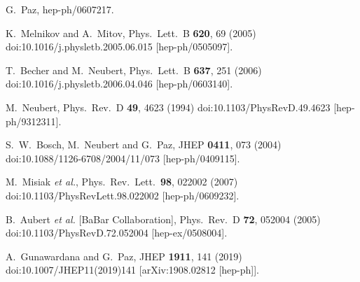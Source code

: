 \begin{thebibliography}{99}
  G.~Paz,
  hep-ph/0607217.
  
  K.~Melnikov and A.~Mitov,
  Phys.\ Lett.\ B {\bf 620}, 69 (2005)
  doi:10.1016/j.physletb.2005.06.015
  [hep-ph/0505097].
  
  T.~Becher and M.~Neubert,
  Phys.\ Lett.\ B {\bf 637}, 251 (2006)
  doi:10.1016/j.physletb.2006.04.046
  [hep-ph/0603140].

  M.~Neubert,
  Phys.\ Rev.\ D {\bf 49}, 4623 (1994)
  doi:10.1103/PhysRevD.49.4623
  [hep-ph/9312311].
  
  S.~W.~Bosch, M.~Neubert and G.~Paz,
  JHEP {\bf 0411}, 073 (2004)
  doi:10.1088/1126-6708/2004/11/073
  [hep-ph/0409115].
  
  M.~Misiak {\it et al.},
  Phys.\ Rev.\ Lett.\  {\bf 98}, 022002 (2007)
  doi:10.1103/PhysRevLett.98.022002
  [hep-ph/0609232].
  
  B.~Aubert {\it et al.} [BaBar Collaboration],
  Phys.\ Rev.\ D {\bf 72}, 052004 (2005)
  doi:10.1103/PhysRevD.72.052004
  [hep-ex/0508004].
  
  A.~Gunawardana and G.~Paz,
  JHEP {\bf 1911}, 141 (2019)
  doi:10.1007/JHEP11(2019)141
  [arXiv:1908.02812 [hep-ph]].
  

\end{thebibliography}
